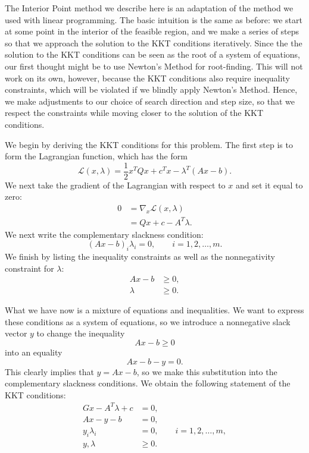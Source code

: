 The Interior Point method we describe here is an adaptation of the method we used with linear
programming. The basic intuition is the same as before: we start at some point in the interior of the
feasible region, and we make a series of steps so that we approach the solution to the KKT conditions
iteratively. Since the the solution to the KKT conditions can be seen as the root of a system of equations,
our first thought might be to use Newton's Method for root-finding. This will not work on its own, however,
because the KKT conditions also require inequality constraints, which will be violated if we blindly apply
Newton's Method. Hence, we make adjustments to our choice of search direction and step size, so that we
respect the constraints while moving closer to the solution of the KKT conditions.

We begin by deriving the KKT conditions for this problem. The first step is to form the Lagrangian function,
which has the form
\[
\mathcal{L}(x,\lambda) = \frac{1}{2}x^TQx + c^Tx - \lambda^T(Ax -b).
\]
We next take the gradient of the Lagrangian with respect to $x$ and set it equal to zero:
\begin{align*}
0 &= \nabla_x \mathcal{L}(x,\lambda)\\
&= Qx + c - A^T\lambda.
\end{align*}
We next write the complementary slackness condition:
\[
(Ax - b)_i\lambda_i = 0, \qquad i=1,2,\ldots,m.
\]
We finish by listing the inequality constraints as well as the nonnegativity constraint for $\lambda$:
\begin{align*}
Ax - b &\geq 0,\\
\lambda &\geq 0.
\end{align*}

What we have now is a mixture of equations and inequalities. We want to express these conditions as a system of equations,
so we introduce a nonnegative slack vector $y$ to change the inequality
\[
Ax - b \geq 0
\]
into an equality
\[
Ax - b - y = 0.
\]
This clearly implies that $y = Ax - b$, so we make this substitution into the complementary slackness conditions.
We obtain the following statement of the KKT conditions:
\begin{align*}
Gx - A^T\lambda + c &= 0,\\
Ax - y - b &= 0,\\
y_i\lambda_i &= 0, \qquad i=1,2,\ldots,m,\\
y,\lambda &\geq 0.
\end{align*}


